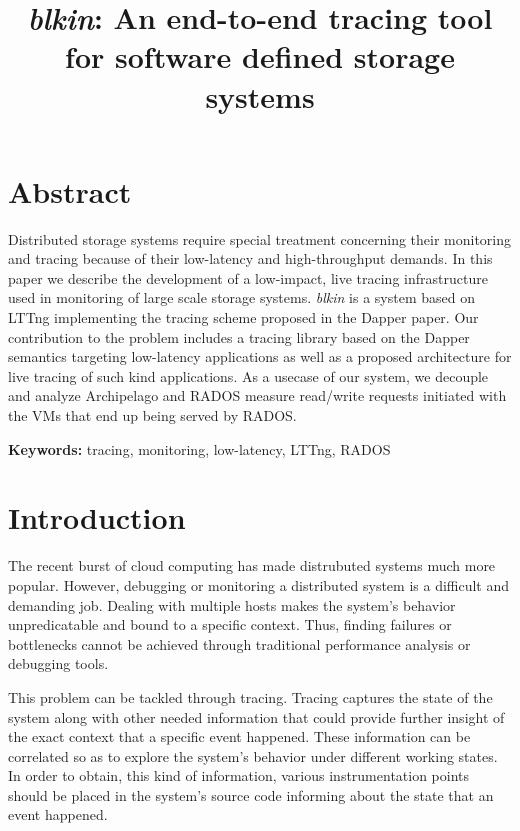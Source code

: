 \documentclass[a4paper,10pt,twocolumn]{article}
\begin{document}
\title{\emph{blkin}: An end-to-end tracing tool for software defined storage 
systems}
\date{}
\maketitle

\section*{Abstract}
Distributed storage systems require special treatment concerning their 
monitoring and tracing because of their low-latency and high-throughput demands.
In this paper we describe the development of a low-impact, live tracing 
infrastructure used in monitoring of large scale storage systems. \emph{blkin}
is a system based on LTTng\cite{lttng} implementing the tracing scheme proposed
in the Dapper paper\cite{dapper}. Our contribution to the problem includes a 
tracing library based on the Dapper semantics targeting low-latency applications
as well as a proposed architecture for live tracing of such kind applications.
As a usecase of our system, we decouple and analyze Archipelago\cite{archip} and
RADOS\cite{rados} measure read/write requests initiated with the VMs that end up
being served by RADOS.


\textbf{Keywords: } tracing, monitoring, low-latency, LTTng, RADOS

\section{Introduction}

The recent burst of cloud computing has made distrubuted systems much more
popular. However, debugging or monitoring a distributed system is a difficult
and demanding job. Dealing with multiple hosts makes the system's behavior
unpredicatable and bound to a specific context. Thus, finding failures or
bottlenecks cannot be achieved through traditional performance analysis or
debugging tools. 

This problem can be tackled through tracing. Tracing captures the state of the
system along with other needed information that could provide further insight of
the exact context that a specific event happened. These information can be
correlated so as to explore the system's behavior under different working
states. In order to obtain, this kind of information, various instrumentation
points should be placed in the system's source code informing about the state
that an event happened.
\end{document}
